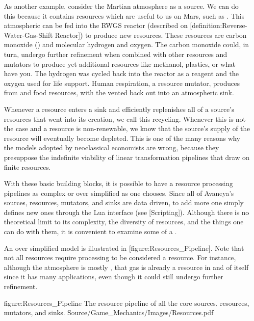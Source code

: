 As another example, consider the Martian atmosphere as a source. We can do this because it contains resources which are useful to us on Mars, such as . This atmospheric  can be fed into the RWGS reactor (described on [definition:Reverse-Water-Gas-Shift Reactor]) to produce new resources. These resources are carbon monoxide () and molecular hydrogen and oxygen. The carbon monoxide could, in turn, undergo further refinement when combined with other resources and mutators to produce yet additional resources like methanol, plastics, or what have you. The hydrogen was cycled back into the reactor as a reagent and the oxygen used for life support. Human respiration, a resource mutator, produces  from  and food resources, with the  vented back out into an atmospheric sink.

Whenever a resource enters a sink and efficiently replenishes all of a source's resources that went into its creation, we call this recycling. Whenever this is not the case and a resource is non-renewable, we know that the source's supply of the resource will eventually become depleted. This is one of the many reasons why the models adopted by neoclassical economists are wrong, because they presuppose the indefinite viability of linear transformation pipelines that draw on finite resources.

With these basic building blocks, it is possible to have a resource processing pipelines as complex or over simplified as one chooses. Since all of Avaneya's sources, resources, mutators, and sinks are data driven, to add more one simply defines new ones through the Lua interface (see [Scripting]). Although there is no theoretical limit to its complexity, the diversity of resources, and the things one can do with them, it is convenient to examine some of a .

An over simplified model is illustrated in [figure:Resources_Pipeline]. Note that not all resources require processing to be considered a resource. For instance, although the atmosphere is mostly , that gas is already a resource in and of itself since it has many applications, even though it could still undergo further refinement.

\FullPageDiagram
    {figure:Resources_Pipeline}
    {The resource pipeline of all the core sources, resources, mutators, and sinks.}
    {Source/Game_Mechanics/Images/Resources.pdf}

